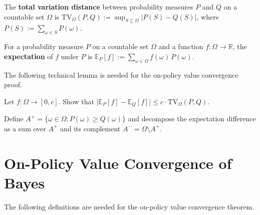 \documentclass[fontsize=11pt, parskip=half]{scrartcl}
\newcommand{\Ex}{\mathbb{E}}
\newcommand{\TV}[1][]{\mathrm{TV}_{#1}}
\begin{document}
\begin{definition}\label{def:tv}
The \textbf{total variation distance} between probability measures $P$ and $Q$ on a countable set $\Omega$ is $\TV[\Omega](P, Q) := \sup_{S \subseteq \Omega} |P(S) - Q(S)|$, where $P(S) := \sum_{\omega \in S} P(\omega)$.
\end{definition}

\begin{definition}\label{def:expectation_P}
For a probability measure $P$ on a countable set $\Omega$ and a function $f : \Omega \to \mathbb{R}$, the \textbf{expectation} of $f$ under $P$ is
$\Ex_P[f] := \sum_{\omega \in \Omega} f(\omega)\, P(\omega)$.
\end{definition}

The following technical lemma is needed for the on-policy value convergence proof.

\begin{exercise}
\label{prob:auto3}
\skippable
Let $f : \Omega \to [0, c]$. Show that
$\big|\Ex_P[f] - \Ex_Q[f]\big| \leq c \cdot \TV[\Omega](P, Q)$.


\begin{hint}
Define $A^+ = \{\omega \in \Omega : P(\omega) \geq Q(\omega)\}$ and decompose the expectation difference as a sum over $A^+$ and its complement $A^- = \Omega \setminus A^+$.
\end{hint}
\end{exercise}





\section{On-Policy Value Convergence of Bayes}\label{prob:on_policy}



The following definitions are needed for the on-policy value convergence theorem.
\end{document}

